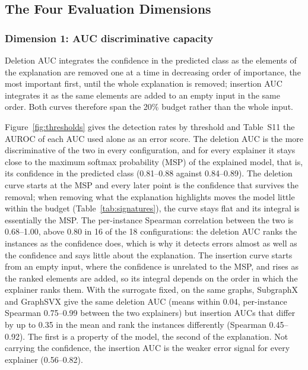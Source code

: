 
\subsection{The Four Evaluation Dimensions} \label{sec:dim1} \label{sec:dim2} \label{sec:dim3} \label{sec:dim4}

\subsubsection{Dimension 1: AUC discriminative capacity}

Deletion AUC integrates the confidence in the predicted class as the elements of the explanation are removed one at a time in decreasing order of importance, the most important first, until the whole explanation is removed; insertion AUC integrates it as the same elements are added to an empty input in the same order. Both curves therefore span the 20\% budget rather than the whole input.

Figure~\ref{fig:thresholds} gives the detection rates by threshold and Table~S11 the AUROC of each AUC used alone as an error score. The deletion AUC is the more discriminative of the two in every configuration, and for every explainer it stays close to the maximum softmax probability (MSP) of the explained model, that is, its confidence in the predicted class (0.81--0.88 against 0.84--0.89). The deletion curve starts at the MSP and every later point is the confidence that survives the removal; when removing what the explanation highlights moves the model little within the budget (Table~\ref{tab:signatures}), the curve stays flat and its integral is essentially the MSP. The per-instance Spearman correlation between the two is 0.68--1.00, above 0.80 in 16 of the 18 configurations: the deletion AUC ranks the instances as the confidence does, which is why it detects errors almost as well as the confidence and says little about the explanation. The insertion curve starts from an empty input, where the confidence is unrelated to the MSP, and rises as the ranked elements are added, so its integral depends on the order in which the explainer ranks them. With the surrogate fixed, on the same graphs, SubgraphX and GraphSVX give the same deletion AUC (means within 0.04, per-instance Spearman 0.75--0.99 between the two explainers) but insertion AUCs that differ by up to 0.35 in the mean and rank the instances differently (Spearman 0.45--0.92). The first is a property of the model, the second of the explanation. Not carrying the confidence, the insertion AUC is the weaker error signal for every explainer (0.56--0.82).

